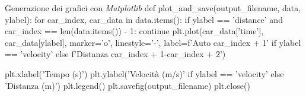 \begin{pyCode}{Generazione dei grafici con \textit{Matplotlib}}
def plot_and_save(output_filename, data, ylabel):
  for car_index, car_data in data.items():
    if ylabel == 'distance' and car_index == len(data.items()) - 1:
      continue
    plt.plot(car_data['time'], car_data[ylabel], marker='o', linestyle='-', 
      label=f'Auto {car_index + 1}' if ylabel == 'velocity'
        else f'Distanza {car_index + 1}-{car_index + 2}')

  plt.xlabel('Tempo (s)')
  plt.ylabel('Velocità (m/s)' if ylabel == 'velocity' else 'Distanza (m)')
  plt.legend()
  plt.savefig(output_filename)
  plt.close()
\end{pyCode}